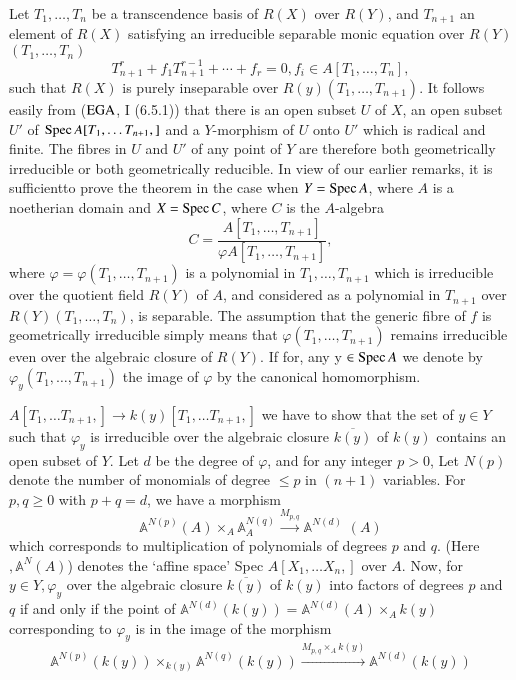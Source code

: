 Let $T_1,\ldots, T_n$ be a transcendence basis of $R(X)$ over
$R(Y)$, and $T_{n+1}$ an element of $R(X)$ satisfying an irreducible
separable monic equation over $R(Y)$ $(T_1,\ldots,T_n)$  
$$
T^r_{n+1} + f_1 T^{r-1}_{n+1}+\cdots + f_r =0, f_i \in A [T_1,\ldots,T_n ],
$$
such that $R(X)$ is purely inseparable over
$R(y)(T_1,\ldots,T_{n+1})$. It follows easily from ($\operatorname{EGA}$, I (6.5.1))
that there is an open subset $U$ of $X$, an open subset $U'$ of $\operatorname{Spec}
A [T_1,\ldots T_{n+1},]$ and a $Y$-morphism of $U$ onto $U'$ which is
radical and finite. The fibres in $U$ and $U'$ of any
point of $Y$ are therefore both geometrically irreducible or both
geometrically reducible. In view of our earlier remarks, it is
sufficient\pageoriginale to prove the theorem in the case when $Y=
\operatorname{Spec} A$, where 
$A$ is a noetherian domain and $X= \operatorname{Spec} C$, where $C$ is the
$A$-algebra  
$$
C=\frac{A[T_1,\ldots,T_{n+1}]}{\varphi A[T_1,\ldots,T_{n+1}]},
$$
where $\varphi = \varphi (T_1,\ldots,T_{n+1})$ is a polynomial in
$T_1,\ldots,T_{n+1}$ which is irreducible over the quotient field
$R(Y)$ of $A$, and  considered as a polynomial in $T_{n+1}$ over $R(Y)
(T_1,\ldots,T_n)$, is separable. The assumption that the generic fibre
of $f$ is geometrically irreducible simply means that $\varphi
(T_1,\ldots,T_{n+1})$ remains irreducible even over the algebraic
closure of $R(Y)$. If for, any y $\in \operatorname{Spec} A$ we denote by  
$\varphi_y(T_1,\ldots,T_{n+1})$  the image of $\varphi$ by the
canonical homomorphism. 

$A [ T_1 ,\ldots T_{n+1},] \rightarrow k(y) [ T_1 ,\ldots T_{n+1},]$
we have to show that the set of $y \in Y$ such that $\varphi_y$ is
irreducible over the algebraic closure $\overline{k(y)}$ of $k(y)$
contains an open subset of $Y$. Let $d$ be the degree of $\varphi$,
and  for any integer $p >0$, Let $N(p)$ denote the number of
monomials of degree $\le p$ in $(n+1)$ variables. For $p, q \ge 0$ with
$p+q=d$, we have a morphism  
$$
\mathbb{A}^{N(p)} (A) \times_A \mathbb{A}^{N(q)}_{A}
\xrightarrow{M_{p,q}}\mathbb{A}^{N(d)}   \, \,(A) 
$$
which corresponds to multiplication of polynomials of degrees $p$ and
$q$. (Here $,\mathbb{A}^N(A)$) denotes the `affine space' Spec $A [
  X_1,\ldots X_n, ]$ over $A$. Now, for $y \in Y, \varphi_y$ over the
algebraic closure  $\overline {k(y)} $ of  $k(y)$ into factors of
degrees $p$ and $q$ if and only if the point of 
$\mathbb{A}^{N(d)}(k(y)) = \mathbb{A}^{N(d)} (A) \times_A
k(y)$\pageoriginale 
corresponding to $\varphi_y$ is in the image of the morphism 
$$
\mathbb{A}^{N(p)}(k(y))
\times_{k(y)} \mathbb{A}^{N(q)} (k(y))
\xrightarrow{M_{p,q} \times_A k(y)} \mathbb{A}^{N(d)} (k(y))
$$

